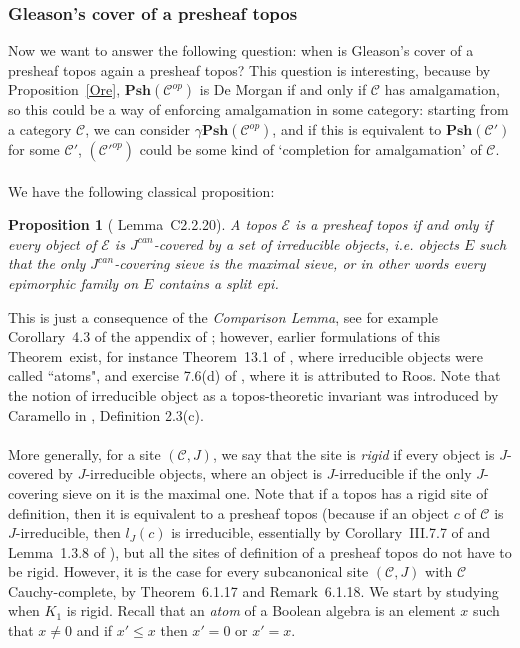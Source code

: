 \documentclass{article}
\newtheorem{proposition}[theorem]{Proposition}
\begin{document}
\subsubsection{Gleason's cover of a presheaf topos}\label{gc_psh}
Now we want to answer the following question: when is Gleason's cover of a presheaf topos again a presheaf topos? This question is interesting, because by Proposition~\ref{Ore}, $\mathbf{Psh}(\mathcal{C}^{op})$ is De Morgan if and only if $\mathcal{C}$ has amalgamation, so this could be a way of enforcing amalgamation in some category: starting from a category $\mathcal{C}$, we can consider $\gamma \mathbf{Psh}(\mathcal{C}^{op})$, and if this is equivalent to $\mathbf{Psh}(\mathcal{C}')$ for some $\mathcal{C}'$, $(\mathcal{C}'^{op})$ could be some kind of `completion for amalgamation' of $\mathcal{C}$.\\
\\
We have the following classical proposition: 
\begin{proposition}[\cite{johnstone2002sketches} Lemma~C2.2.20]
    A topos $\mathcal{E}$ is a presheaf topos if and only if every object of $\mathcal{E}$ is $J^{can}$-covered by a set of irreducible objects, i.e. objects $E$ such that the only $J^{can}$-covering sieve is the maximal sieve, or in other words every epimorphic family on $E$ contains a split epi.
\end{proposition}
This is just a consequence of the \emph{Comparison Lemma}, see for example Corollary~4.3 of the appendix of \cite{maclane2012sheaves}; however, earlier formulations of this Theorem~exist, for instance Theorem~13.1 of \cite{bunge1966categories}, where irreducible objects were called ``atoms", and exercise 7.6(d) of \cite{grothendieck2006sga}, where it is attributed to Roos. Note that the notion of irreducible object as a topos-theoretic invariant was introduced by Caramello in \cite{caramello2012syntactic}, Definition 2.3(c).\\
\\
More generally, for a site $(\mathcal{C},J)$, we say that the site is \emph{rigid} if every object is $J$-covered by $J$-irreducible objects, where an object is $J$-irreducible if the only $J$-covering sieve on it is the maximal one. Note that if a topos has a rigid site of definition, then it is equivalent to a presheaf topos (because if an object $c$ of $\mathcal{C}$ is $J$-irreducible, then $l_J(c)$ is irreducible, essentially by Corollary~III.7.7 of \cite{maclane2012sheaves} and Lemma~1.3.8 of \cite{makkai2006first}), but all the sites of definition of a presheaf topos do not have to be rigid. However, it is the case for every subcanonical site $(\mathcal{C},J)$ with $\mathcal{C}$ Cauchy-complete, by \cite{caramello2018theories} Theorem~6.1.17 and Remark~6.1.18. We start by studying when $K_1$ is rigid. Recall that an \emph{atom} of a Boolean algebra is an element $x$ such that $x\ne 0$ and if $x'\leq x$ then $x'=0$ or $x'=x$.
\end{document}
